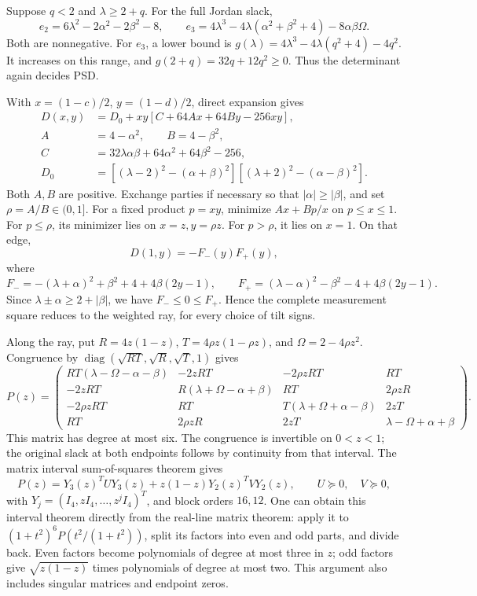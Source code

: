 \documentclass[11pt]{article}
\begin{document}
Suppose \(q<2\) and \(\lambda\ge2+q\). For the full Jordan slack,
\[
 e_2=6\lambda^2-2\alpha^2-2\beta^2-8,\qquad
 e_3=4\lambda^3-4\lambda(\alpha^2+\beta^2+4)-8\alpha\beta\Omega .
\]
Both are nonnegative. For \(e_3\), a lower bound is
\(g(\lambda)=4\lambda^3-4\lambda(q^2+4)-4q^2\).
It increases on this range, and \(g(2+q)=32q+12q^2\ge0\).
Thus the determinant again decides PSD.

With \(x=(1-c)/2\), \(y=(1-d)/2\), direct expansion gives
\begin{align*}
 D(x,y)&=D_0+xy[C+64Ax+64By-256xy],\\
 A&=4-\alpha^2,\qquad B=4-\beta^2,\\
 C&=32\lambda\alpha\beta+64\alpha^2+64\beta^2-256,\\
 D_0&=[(\lambda-2)^2-(\alpha+\beta)^2]
       [(\lambda+2)^2-(\alpha-\beta)^2].
\end{align*}
Both \(A,B\) are positive. Exchange parties if necessary so that
\(|\alpha|\ge|\beta|\), and set \(\rho=A/B\in(0,1]\).
For a fixed product \(p=xy\), minimize \(Ax+Bp/x\) on \(p\le x\le1\).
For \(p\le\rho\), its minimizer lies on \(x=z,y=\rho z\).
For \(p>\rho\), it lies on \(x=1\). On that edge,
\[
 D(1,y)=-F_-(y)F_+(y),
\]
where
\[
 F_-=-(\lambda+\alpha)^2+\beta^2+4+4\beta(2y-1),\qquad
 F_+=(\lambda-\alpha)^2-\beta^2-4+4\beta(2y-1).
\]
Since \(\lambda\pm\alpha\ge2+|\beta|\), we have \(F_-\le0\le F_+\).
Hence the complete measurement square reduces to the weighted ray, for every
choice of tilt signs.

Along the ray, put
\(R=4z(1-z)\), \(T=4\rho z(1-\rho z)\), and \(\Omega=2-4\rho z^2\).
Congruence by \(\operatorname{diag}(\sqrt{RT},\sqrt R,\sqrt T,1)\) gives
\begin{equation}
 P(z)=
 \begin{pmatrix}
 RT(\lambda-\Omega-\alpha-\beta)&-2zRT&-2\rho zRT&RT\\
 -2zRT&R(\lambda+\Omega-\alpha+\beta)&RT&2\rho zR\\
 -2\rho zRT&RT&T(\lambda+\Omega+\alpha-\beta)&2zT\\
 RT&2\rho zR&2zT&\lambda-\Omega+\alpha+\beta
 \end{pmatrix}.
 \label{eq:rayP}
\end{equation}
This matrix has degree at most six. The congruence is invertible on \(0<z<1\);
the original slack at both endpoints follows by continuity from that interval.
The matrix interval sum-of-squares theorem gives
\begin{equation}
 P(z)=Y_3(z)^TUY_3(z)+z(1-z)Y_2(z)^TVY_2(z),\qquad
 U\succeq0,\quad V\succeq0,
 \label{eq:interval}
\end{equation}
with \(Y_j=(I_4,zI_4,\ldots,z^jI_4)^T\), and block orders \(16,12\).
One can obtain this interval theorem directly from the real-line matrix theorem:
apply it to \((1+t^2)^6P(t^2/(1+t^2))\), split its factors into even and odd parts,
and divide back. Even factors become polynomials of degree at most three in \(z\);
odd factors give \(\sqrt{z(1-z)}\) times polynomials of degree at most two.
This argument also includes singular matrices and endpoint zeros.
\end{document}
